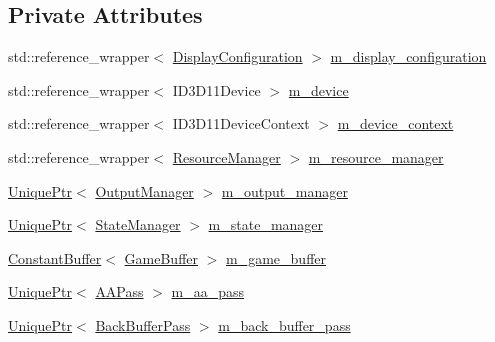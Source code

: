 \subsection*{Private Attributes}
\begin{DoxyCompactItemize}
\item 
std\+::reference\+\_\+wrapper$<$ \hyperlink{classmage_1_1rendering_1_1_display_configuration}{Display\+Configuration} $>$ \hyperlink{classmage_1_1rendering_1_1_renderer_1_1_impl_a10cf7a42791591339e7abae67e1a0624}{m\+\_\+display\+\_\+configuration}
\item 
std\+::reference\+\_\+wrapper$<$ I\+D3\+D11\+Device $>$ \hyperlink{classmage_1_1rendering_1_1_renderer_1_1_impl_acbd7937a78edf6a8c3f24fc0a300216b}{m\+\_\+device}
\item 
std\+::reference\+\_\+wrapper$<$ I\+D3\+D11\+Device\+Context $>$ \hyperlink{classmage_1_1rendering_1_1_renderer_1_1_impl_a4ab027121f4d0fd9ab8f35f5d2fcfca6}{m\+\_\+device\+\_\+context}
\item 
std\+::reference\+\_\+wrapper$<$ \hyperlink{classmage_1_1rendering_1_1_resource_manager}{Resource\+Manager} $>$ \hyperlink{classmage_1_1rendering_1_1_renderer_1_1_impl_a4e128f17ff567e4af890c730c6357c94}{m\+\_\+resource\+\_\+manager}
\item 
\hyperlink{namespacemage_a3316d7143a973e37adf1110f2e80ca31}{Unique\+Ptr}$<$ \hyperlink{classmage_1_1rendering_1_1_output_manager}{Output\+Manager} $>$ \hyperlink{classmage_1_1rendering_1_1_renderer_1_1_impl_a177cc2fc2cab6c39fc26046e1bea8b97}{m\+\_\+output\+\_\+manager}
\item 
\hyperlink{namespacemage_a3316d7143a973e37adf1110f2e80ca31}{Unique\+Ptr}$<$ \hyperlink{classmage_1_1rendering_1_1_state_manager}{State\+Manager} $>$ \hyperlink{classmage_1_1rendering_1_1_renderer_1_1_impl_a403fbd5958b798e426683c6d671b056c}{m\+\_\+state\+\_\+manager}
\item 
\hyperlink{classmage_1_1rendering_1_1_constant_buffer}{Constant\+Buffer}$<$ \hyperlink{structmage_1_1rendering_1_1_game_buffer}{Game\+Buffer} $>$ \hyperlink{classmage_1_1rendering_1_1_renderer_1_1_impl_a31c129ce1fe4b65b3e4a4ad3d33270df}{m\+\_\+game\+\_\+buffer}
\item 
\hyperlink{namespacemage_a3316d7143a973e37adf1110f2e80ca31}{Unique\+Ptr}$<$ \hyperlink{classmage_1_1rendering_1_1_a_a_pass}{A\+A\+Pass} $>$ \hyperlink{classmage_1_1rendering_1_1_renderer_1_1_impl_aeb6351e4bacece7f3682685d74593d18}{m\+\_\+aa\+\_\+pass}
\item 
\hyperlink{namespacemage_a3316d7143a973e37adf1110f2e80ca31}{Unique\+Ptr}$<$ \hyperlink{classmage_1_1rendering_1_1_back_buffer_pass}{Back\+Buffer\+Pass} $>$ \hyperlink{classmage_1_1rendering_1_1_renderer_1_1_impl_aa030ca4a6167a0dead99172e922ae724}{m\+\_\+back\+\_\+buffer\+\_\+pass}

\end{DoxyCompactItemize}

